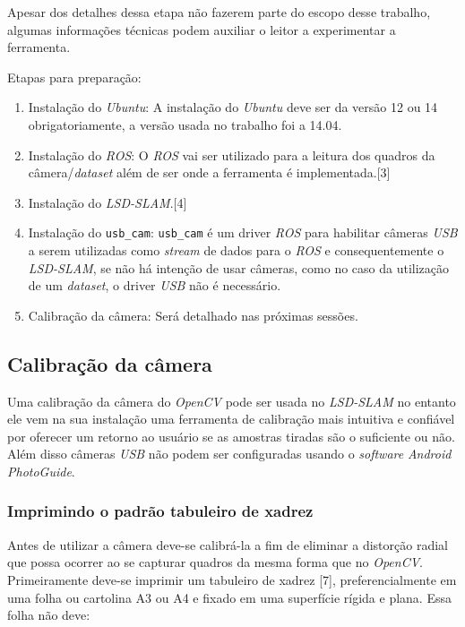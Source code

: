 Apesar dos detalhes dessa etapa não fazerem parte do escopo desse trabalho, algumas informações técnicas podem auxiliar o leitor a experimentar a ferramenta.

Etapas para preparação:

\begin{enumerate}
	\item{Instalação do \textit{Ubuntu}: A instalação do \textit{Ubuntu} deve ser da versão 12 ou 14 obrigatoriamente, a versão usada no trabalho foi a 14.04.}
	\item{Instalação do  \textit{ROS}: O \textit{ROS} vai ser utilizado para a leitura dos quadros da câmera/\textit{dataset} além de ser onde a ferramenta é implementada.[3]}
	\item{Instalação do \textit{LSD-SLAM}.[4]}
	\item{Instalação do  \texttt{usb\_cam}: \texttt{usb\_cam} é um driver \textit{ROS} para habilitar câmeras \textit{USB} a serem utilizadas como \textit{stream} de dados para o \textit{ROS} e consequentemente o \textit{LSD-SLAM}, se não há intenção de usar câmeras, como no caso da utilização de um \textit{dataset}, o driver \textit{USB} não é necessário.}
	\item{Calibração da câmera: Será detalhado nas próximas sessões.}
\end{enumerate}

\subsection{Calibração da câmera}

Uma calibração da câmera do \textit{OpenCV} pode ser usada no \textit{LSD-SLAM} no entanto ele vem na sua instalação uma ferramenta de calibração mais intuitiva e confiável por oferecer um retorno ao usuário se as amostras tiradas são o suficiente ou não. Além disso câmeras \textit{USB} não podem ser configuradas usando o \textit{software} \textit{Android} \textit{PhotoGuide}.

\subsubsection{Imprimindo o padrão tabuleiro de xadrez}

Antes de utilizar a câmera deve-se calibrá-la a fim de eliminar a distorção radial que possa ocorrer ao se capturar quadros da mesma forma que no \textit{OpenCV}.
Primeiramente deve-se imprimir um tabuleiro de xadrez [7], preferencialmente em uma folha ou cartolina A3 ou A4 e fixado em uma superfície rígida e plana. Essa folha não deve: 

